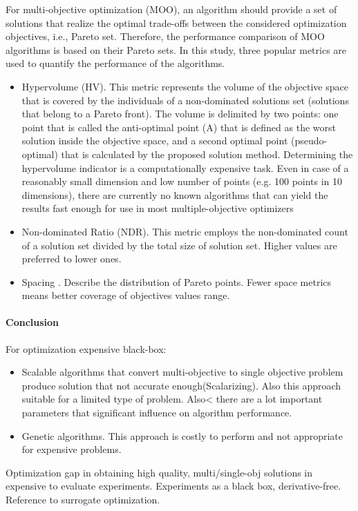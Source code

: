             For multi-objective optimization (MOO), an algorithm should provide a set of solutions that realize the optimal trade-offs between the considered optimization objectives, i.e., Pareto set. Therefore, the performance comparison of MOO algorithms is based on their Pareto sets. In this study, three popular metrics are used to quantify the performance of the algorithms. 
            \begin{itemize}
                \item Hypervolume (HV)\cite{Zitzler2000ComparisonOM}. 
                This metric represents the volume of the objective space that is covered by the individuals of a non-dominated solutions set (solutions that belong to a Pareto front). The volume is delimited by two points: one point that is called the anti-optimal point (A) that is defined as the worst solution inside the objective space, and a second optimal point (pseudo-optimal) that is calculated by the proposed solution method. 
                Determining the hypervolume indicator is a computationally expensive task. Even in case of a reasonably small dimension and low number of points (e.g. 100 points in 10 dimensions), 
                there are currently no known algorithms that can yield the results fast enough for use in most multiple-objective optimizers
                \item Non-dominated Ratio (NDR). This metric employs the non-dominated count of a solution set divided by the total size of solution set. Higher values are preferred to lower ones.
                \item Spacing \cite{Schott1995FaultTD}. Describe the distribution of Pareto points. Fewer space metrics means better coverage of objectives values range.
                
            \end{itemize}

        \paragraph{Conclusion}

            For optimization expensive black-box:
            \begin{itemize}
                \item Scalable algorithms that convert multi-objective to single objective problem produce solution that not accurate enough(Scalarizing). Also this approach suitable for a limited type of problem. Also< there are a lot important parameters that significant influence on algorithm performance.
                \item Genetic algorithms. This approach is costly to perform and not appropriate for expensive problems.
            \end{itemize}
            Optimization gap in obtaining high quality, multi/single-obj solutions in expensive to evaluate experiments.
            Experiments as a black box, derivative-free. Reference to surrogate optimization.


